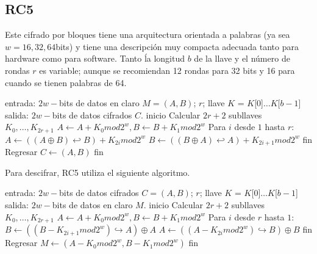 \subsection{RC5}
Este cifrado por bloques tiene una arquitectura orientada a palabras (ya 
sea $w = 16, 32, 64$bits) y tiene una descripción muy compacta adecuada 
tanto para hardware como para software. Tanto ĺa longitud $b$ de la 
llave y el número de rondas $r$ es variable; aunque se recomiendan 12 
rondas para 32 bits y 16 para cuando se tienen palabras de 64.

\begin{pseudocodigo}[caption={RC5, cifrado.}, label={rc5:1}]
  entrada:  $2w-$bits de datos en claro $M = (A, B)$; $r$; 
      llave $K$ = $K$[0]$\dots K$[$b-1$] 
  salida:   $2w-$bits de datos cifrados $C$.
  inicio
    Calcular $2r + 2$ subllaves $K_0, \dots, K_{2r+1}$
    $A \leftarrow A + K_0 mod 2^w, B \leftarrow B + K_1 mod 2^w$
    Para $i$ desde $1$ hasta $r$:
      $A \leftarrow ((A \oplus B) \hookleftarrow B) + K_{2i} mod 2^w$
      $B \leftarrow ((B \oplus A) \hookleftarrow A) + K_{2i+1} mod 2^w$ 
    fin
    Regresar $C \leftarrow (A,B)$
  fin
\end{pseudocodigo}

Para descifrar, RC5 utiliza el siguiente algoritmo.
\begin{pseudocodigo}[caption={RC5, descifrado.}, label={rc5:2}]
  entrada:  $2w-$bits de datos cifrados $C = (A, B)$; $r$; 
      llave $K$ = $K$[0]$\dots K$[$b-1$] 
  salida:   $2w-$bits de datos en claro $M$.
  inicio
    Calcular $2r + 2$ subllaves $K_0, \dots, K_{2r+1}$
    $A \leftarrow A + K_0 mod 2^w, B \leftarrow B + K_1 mod 2^w$
    Para $i$ desde $r$ hasta $1$:
      $B \leftarrow ((B - K_{2i+1} mod 2^w) \hookrightarrow A) \oplus A$
      $A \leftarrow ((A - K_{2i} mod 2^w) \hookrightarrow B) \oplus B$
    fin
    Regresar $M \leftarrow (A-K_0 mod 2^w, B-K_1 mod 2^w)$
  fin
\end{pseudocodigo}
